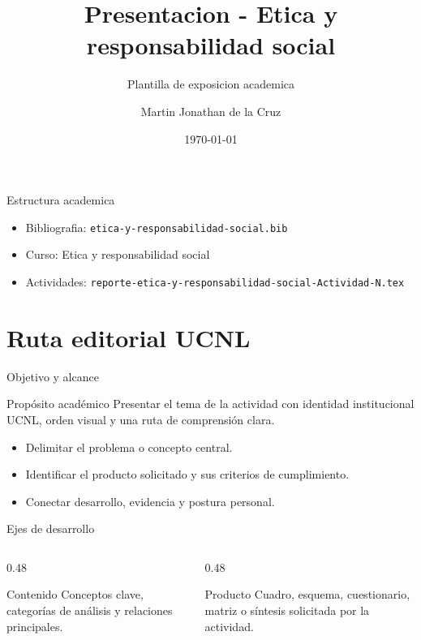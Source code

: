 ﻿\documentclass[spanish,aspectratio=169]{beamer}
\title{Presentacion - Etica y responsabilidad social}
\subtitle{Plantilla de exposicion academica}
\author{Martin Jonathan de la Cruz}
\institute{Universidad Ciudadana de Nuevo Leon}
\date{\today}
\begin{document}
\begin{frame}
  \titlepage
\end{frame}

\begin{frame}{Estructura academica}
  \begin{itemize}
    \item Bibliografia: \texttt{etica-y-responsabilidad-social.bib}
    \item Curso: Etica y responsabilidad social
    \item Actividades: \texttt{reporte-etica-y-responsabilidad-social-Actividad-N.tex}
  \end{itemize}
\end{frame}


\section{Ruta editorial UCNL}

\begin{frame}{Objetivo y alcance}
  \begin{block}{Propósito académico}
    Presentar el tema de la actividad con identidad institucional UCNL, orden visual y una ruta de comprensión clara.
  \end{block}
  \begin{itemize}
    \item Delimitar el problema o concepto central.
    \item Identificar el producto solicitado y sus criterios de cumplimiento.
    \item Conectar desarrollo, evidencia y postura personal.
  \end{itemize}
\end{frame}

\begin{frame}{Ejes de desarrollo}
  \begin{columns}[T,totalwidth=\textwidth]
    \begin{column}{0.48\textwidth}
      \begin{block}{Contenido}
        Conceptos clave, categorías de análisis y relaciones principales.
      \end{block}
    \end{column}
    \begin{column}{0.48\textwidth}
      \begin{block}{Producto}
        Cuadro, esquema, cuestionario, matriz o síntesis solicitada por la actividad.
      \end{block}
    \end{column}
  \end{columns}
\end{frame}
\end{document}

